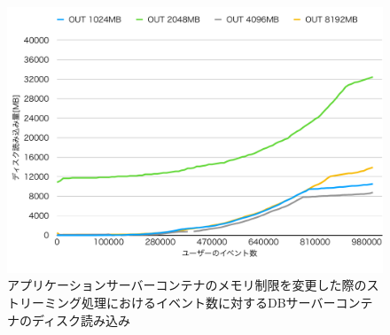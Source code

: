 \documentclass[../../../../../main]{subfiles}
\begin{document}
    \begin{figure}[H]
        \centering
        \includegraphics[width=12cm]{graph}
        \caption{アプリケーションサーバーコンテナのメモリ制限を変更した際のストリーミング処理におけるイベント数に対するDBサーバーコンテナのディスク読み込み}
        \label{fig:stream-change-app-memory-limit-db-disk-out-app_4_db_1_1024}
    \end{figure}
\end{document}
